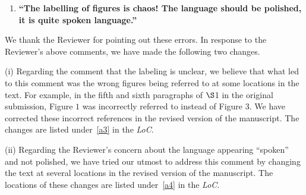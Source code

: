 \documentclass[11pt,letterpaper]{report}
\begin{document}
\begin{enumerate}[label=\textit{1.\arabic*},wide, labelwidth=!, labelindent=0pt]
\begin{enumerate}[label=\textit{2.\arabic*},wide, labelindent=0pt]


\newpage
\item \label{r2c2}{\bf ``The labelling of figures is chaos! The language should be polished, it is quite spoken language.''}
\end{enumerate}

We thank the Reviewer for pointing out these errors. In response to the Reviewer's above comments, we have made the following two changes.

(i) Regarding the comment that the labeling is unclear, we believe that what led to this comment was the wrong figures being referred to at some locations in the text. For example, in the fifth and sixth paragraphs of $\S$1 in the original submission, Figure $1$ was incorrectly referred to instead of Figure $3$. We have corrected these incorrect references in the revised version of the manuscript. The changes are listed under~\ref{a3} in the \textit{LoC}.

(ii) Regarding the Reviewer's concern about the language appearing ``spoken'' and not polished, we have tried our utmost to address this comment by changing the text at several locations in the revised version of the manuscript. The locations of these changes are listed under~\ref{a4} in the \textit{LoC}.


\end{enumerate}

\clearpage



\end{document}
